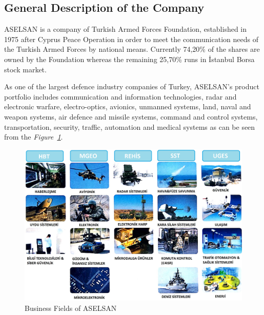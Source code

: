 
\subsection{General Description of the Company}
\-
\indent ASELSAN is a company of Turkish Armed Forces Foundation, established in 1975 after Cyprus Peace Operation in order to meet the communication needs of the Turkish Armed Forces by national means. Currently 74,20\% of the shares are owned by the Foundation whereas the remaining 25,70\% runs in İstanbul Borsa stock market.

	As one of the largest defence industry companies of Turkey, ASELSAN's product portfolio includes communication and information technologies, radar and electronic warfare, electro-optics, avionics, unmanned systems, land, naval and weapon systems, air defence and missile systems, command and control systems, transportation, security, traffic, automation and medical systems as can be seen from the  \textit{Figure~\ref{fig:As12}}. 
	

\begin{figure}[H]
\center
\setlength{\unitlength}{\textwidth} 
\includegraphics[width=0.7\unitlength]{Aselsan1_2}
\caption{\label{fig:As12}Business Fields of ASELSAN }
\end{figure}


